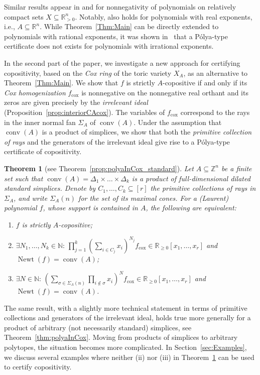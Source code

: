\documentclass[a4paper,11pt]{amsart}
\newtheorem{theoremintro}{Theorem}
\theoremstyle{definition}
\DeclareMathOperator{\conv}{conv}
\DeclareMathOperator{\Newt}{Newt}
\newcommand{\ZZ}{\mathbb{Z}}
\newcommand{\NN}{\mathbb{N}}
\newcommand{\RR}{\mathbb{R}}
\newcommand{\cox}{\mathrm{cox}}
\begin{document}
Similar results appear in \cite[Theorem 7]{WangJainiYuPoupart} and \cite[Theorem 4.1]{DresslerMurray} for nonnegativity of polynomials on relatively compact sets $X \subseteq \RR^n_{>0}$. Notably, \cite[Theorem 4.1]{DresslerMurray} also holds for polynomials with real exponents, i.e., $A \subseteq \RR^n$. 
While Theorem~\ref{Thm:Main} can be directly extended to polynomials with rational exponents, it was shown in~\cite{Delzell} that a Pólya-type certificate does not exists for polynomials with irrational exponents.


In the second part of the paper, we investigate a new approach for certifying copositivity, based on the \emph{Cox ring} of the toric variety $X_A$, as an alternative to Theorem~\ref{Thm:Main}. 
We show that $f$ is strictly $A$-copositive if and only if its \emph{Cox homogenization} $f_\cox$ is nonnegative on the nonnegative real orthant and its zeros are given precisely by the \emph{irrelevant ideal} (Proposition~\ref{prop:interiorCAcox}).
The variables of $f_\cox$ correspond to the rays in the inner normal fan $\Sigma_A$ of $\conv(A)$.
Under the assumption that $\conv(A)$ is a product of simplices, we show that both the \emph{primitive collection of rays} and the generators of the irrelevant ideal give rise to a Pólya-type certificate of copositivity.
\begin{theoremintro}[{see Theorem~\ref{prop:polyaInCox_standard}}]
\label{Prop:Intro} 
   Let $A \subseteq \ZZ^n$ be a finite set such that $\conv(A) = \Delta_1 \times \dots \times \Delta_k$ is a product of full-dimensional dilated standard simplices. Denote by $C_1,\dots,C_k \subseteq [r]$ the primitive collections of rays in $\Sigma_A$, and write $\Sigma_A(n)$ for the set of its maximal cones. For a (Laurent) polynomial $f$, whose support is contained in $A$, the following are equivalent:
\begin{enumerate}
    \item[(i)] $f$ is strictly $A$-copositive;
    \item[(ii)]  $\exists N_1,\ldots,N_k\in \NN\colon\,\prod_{j=1}^k\left(\sum_{i\in C_j}x_i\right)^{N_j }f_\cox \in \RR_{\geq0}[x_1,\dots,x_r]$ and $\Newt(f) = \conv(A)$;
    \item[(iii)] $\exists N\in \NN\colon \, \left(  \sum_{\sigma \in \Sigma_A(n)} \prod_{i \notin \sigma} x_i  \right)^N f_\cox  \in \RR_{\geq0}[x_1,\dots,x_r]$ and $\Newt(f) = \conv(A)$.
\end{enumerate}
\end{theoremintro}
The same result, with a slightly more technical statement in terms of primitive collections and generators of the irrelevant ideal, holds true more generally 
for a product of arbitrary (not necessarily standard) simplices, see Theorem~\ref{thm:polyaInCox}. Moving from products of simplices to arbitrary polytopes, the situation becomes more complicated. In Section~\ref{sec:Examples}, we discuss several examples where neither (ii) nor (iii) in Theorem~\ref{Prop:Intro} can be used to certify copositivity.
\end{document}
